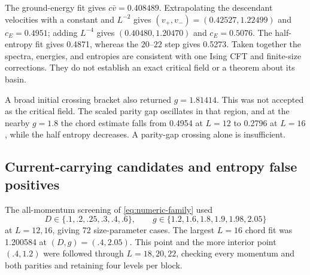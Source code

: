 \documentclass[11pt]{article}
\begin{document}
The ground-energy fit gives $c\bar v=0.408489$. Extrapolating the descendant
velocities with a constant and $L^{-2}$ gives
$(v_+,v_-)=(0.42527,1.22499)$ and $c_E=0.4951$; adding $L^{-4}$ gives
$(0.40480,1.20470)$ and $c_E=0.5076$. The half-entropy fit gives 0.4871,
whereas the $20$--$22$ step gives 0.5273. Taken together the spectra, energies,
and entropies are consistent with one Ising CFT and finite-size corrections.
They do not establish an exact critical field or a theorem about its basin.

A broad initial crossing bracket also returned $g=1.81414$. This was not
accepted as the critical field. The scaled parity gap oscillates in that
region, and at the nearby $g=1.8$ the chord estimate falls from 0.4954 at
$L=12$ to 0.2796 at $L=16$, while the half entropy decreases. A parity-gap
crossing alone is insufficient.

\subsection{Current-carrying candidates and entropy false positives}

The all-momentum screening of \eqref{eq:numeric-family} used
\begin{equation}
 D\in\{.1,.2,.25,.3,.4,.6\},\qquad
 g\in\{1.2,1.6,1.8,1.9,1.98,2.05\}
\end{equation}
at $L=12,16$, giving 72 size-parameter cases. The largest $L=16$ chord fit
was 1.200584 at $(D,g)=(.4,2.05)$. This point and the more interior point
$(.4,1.2)$ were followed through $L=18,20,22$, checking every momentum and
both parities and retaining four levels per block.
\end{document}
